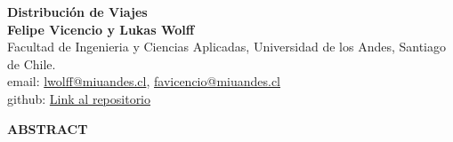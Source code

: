 \documentclass[12pt]{article} %
\begin{document}
\begin{titlepage}%
\newcommand{\HRule}{\rule{\linewidth}{0.5mm}} 
\center 
\begin{center}
  \textbf{\LARGE Distribución de Viajes} \\[0.5cm]
  \textbf{Felipe Vicencio y Lukas Wolff} \\
  Facultad de Ingenieria y Ciencias Aplicadas, Universidad de los Andes, Santiago de Chile.\\
  email: \href{mailto:lwolff@miuandes.cl}{lwolff@miuandes.cl}, \href{mailto:favicencio@miuandes.cl}{favicencio@miuandes.cl}
  \\
  github: \href{https://github.com/LukasWolff2002/TAREA_3_AUTITOS}{Link al repositorio}
\end{center}

\vspace{1cm}

\begin{center}
  \textbf{\large ABSTRACT}    
\end{center}


\end{titlepage}
\end{document}
